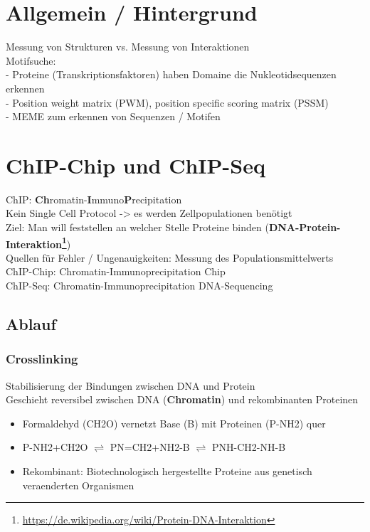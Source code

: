 \section{Allgemein / Hintergrund}
Messung von Strukturen vs. Messung von Interaktionen\\
Motifsuche:\\
- Proteine (Transkriptionsfaktoren) haben Domaine die Nukleotidsequenzen erkennen\\
- Position weight matrix (PWM), position specific scoring matrix (PSSM)\\
- MEME zum erkennen von Sequenzen / Motifen\\

\section{ChIP-Chip und ChIP-Seq}
ChIP: \textbf{Ch}romatin-\textbf{I}mmuno\textbf{P}recipitation\\
Kein Single Cell Protocol -> es werden Zellpopulationen benötigt\\
Ziel: Man will feststellen an welcher Stelle Proteine binden (\textbf{DNA-Protein-Interaktion\footnote{\url{https://de.wikipedia.org/wiki/Protein-DNA-Interaktion}}})\\
Quellen für Fehler / Ungenauigkeiten: Messung des Populationsmittelwerts\\
ChIP-Chip: Chromatin-Immunoprecipitation Chip\\
ChIP-Seq: Chromatin-Immunoprecipitation DNA-Sequencing

\subsection{Ablauf}
\subsubsection{Crosslinking}
Stabilisierung der Bindungen zwischen DNA und Protein\\
Geschieht reversibel zwischen DNA (\textbf{Chromatin}) und rekombinanten Proteinen
\begin{itemize}
	\item Formaldehyd (CH2O) vernetzt Base (B) mit Proteinen (P-NH2) quer
	\item P-NH2+CH2O $\rightleftharpoons$ PN=CH2+NH2-B $\rightleftharpoons$ PNH-CH2-NH-B
	\item Rekombinant: Biotechnologisch hergestellte Proteine aus genetisch 
veraenderten Organismen
\end{itemize}

